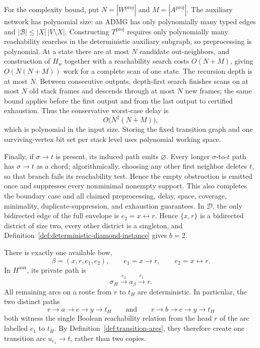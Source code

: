 For the complexity bound, put \(N=|W^{\mathrm{proj}}|\) and \(M=|A^{\mathrm{proj}}|\).  The auxiliary network has polynomial size: an ADMG has only polynomially many typed edges and \(|\mathcal B|\leq |X|\,|V\setminus X|\).  Constructing \(T^{\mathrm{proj}}\) requires only polynomially many reachability searches in the deterministic auxiliary subgraph, so preprocessing is polynomial.  At a state there are at most \(N\) candidate out-neighbors, and construction of \(H_w\) together with a reachability search costs \(O(N+M)\), giving \(O(N(N+M))\) work for a complete scan of one state.  The recursion depth is at most \(N\).  Between consecutive outputs, depth-first search finishes scans on at most \(N\) old stack frames and descends through at most \(N\) new frames; the same bound applies before the first output and from the last output to certified exhaustion.  Thus the conservative worst-case delay is
\[
 O\bigl(N^2(N+M)\bigr),
\]
which is polynomial in the input size.  Storing the fixed transition graph and one surviving-vertex bit set per stack level uses polynomial working space.

Finally, if \(\sigma\to t\) is present, its induced path emits \(\varnothing\).  Every longer \(\sigma\)-to-\(t\) path has \(\sigma\to t\) as a chord; algorithmically, choosing any other first neighbor deletes \(t\), so that branch fails its reachability test.  Hence the empty obstruction is emitted once and suppresses every nonminimal nonempty support.  This also completes the boundary case and all claimed preprocessing, delay, space, coverage, minimality, duplicate-suppression, and exhaustion guarantees.
In \(\mathcal D\), the only bidirected edge of the full envelope is \(e_2=x\leftrightarrow r\).  Hence \(\{x,r\}\) is a bidirected district of size two, every other district is a singleton, and Definition~\ref{def:deterministic-diamond-instance} gives \(b=2\).

There is exactly one available bow,
\[
 \beta=(x,r,e_1,e_2),
 \qquad e_1=x\to r,
 \qquad e_2=x\leftrightarrow r.
\]
In \(H^{\mathrm{aux}}\), its private path is
\[
 \sigma_H\xrightarrow{e_2}a_\beta
 \xrightarrow{e_1}r.
\]
All remaining arcs on a route from \(r\) to \(t_H\) are deterministic.  In particular, the two distinct paths
\[
 r\to a\to c\to y\to t_H
 \qquad\text{and}\qquad
 r\to b\to c\to y\to t_H
\]
both witness the single Boolean reachability relation from the head \(r\) of the arc labelled \(e_1\) to \(t_H\).  By Definition~\ref{def:transition-arcs}, they therefore create one transition arc \(u_{e_1}\to t\), rather than two copies.

